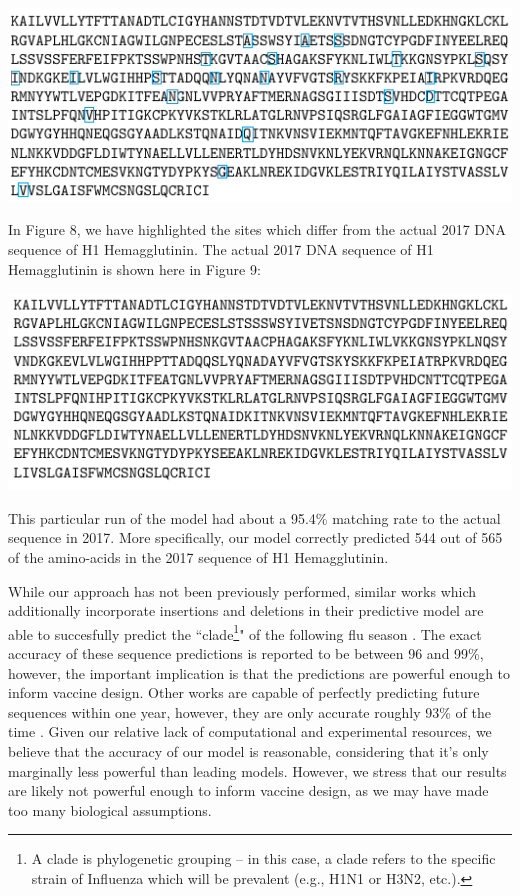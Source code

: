 \documentclass[12pt]{article}
\newenvironment{Figure}
  {\par\medskip\noindent\minipage{\linewidth}}
  {\endminipage\par\medskip}
\begin{document}
\begin{multicols}{2}
\begin{Figure}
 \centering
 \includegraphics[width=\linewidth]{examplePrediction.PNG}
\end{Figure}

In Figure 8, we have highlighted the sites which differ from the actual 2017 DNA sequence of H1 Hemagglutinin. The actual 2017 DNA sequence of H1 Hemagglutinin is shown here in Figure 9:

\begin{Figure}
 \centering
 \includegraphics[width=\linewidth]{2017_actual.PNG}
\end{Figure}

This particular run of the model had about a 95.4\% matching rate to the actual sequence in 2017. More specifically, our model correctly predicted 544 out of 565 of the amino-acids in the 2017 sequence of H1 Hemagglutinin.

While our approach has not been previously performed, similar works which additionally incorporate insertions and deletions in their predictive model are able to succesfully predict the ``clade\footnote{A clade is phylogenetic grouping -- in this case, a clade refers to the specific strain of Influenza which will be prevalent (e.g., H1N1 or H3N2, etc.).}" of the following flu season \citep{luksza2014predictive}. The exact accuracy of these sequence predictions is reported to be between 96 and 99\%, however, the important implication is that the predictions are powerful enough to inform vaccine design. Other works are capable of perfectly predicting future sequences within one year, however, they are only accurate roughly 93\% of the time \citep{koelle2014influenza}. Given our relative lack of computational and experimental resources, we believe that the accuracy of our model is reasonable, considering that it's only marginally less powerful than leading models. However, we stress that our results are likely not powerful enough to inform vaccine design, as we may have made too many biological assumptions.


\end{multicols}
\end{document}
